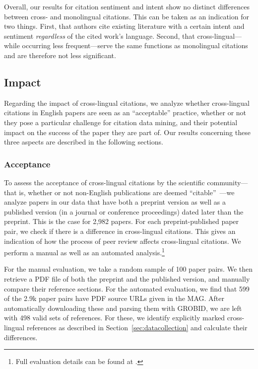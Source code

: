 Overall, our results for citation sentiment and intent show no distinct differences between cross- and monolingual citations. This can be taken as an indication for two things. First, that authors cite existing literature with a certain intent and sentiment \emph{regardless} of the cited work's language. Second, that cross-lingual---while occurring less frequent---serve the same functions as monolingual citations and are therefore not less significant.


\subsection{Impact}
\label{sec:xling-impact}
Regarding the impact of cross-lingual citations, we analyze whether cross-lingual citations in English papers are seen as an ``acceptable'' practice, whether or not they pose a particular challenge for citation data mining, and their potential impact on the success of the paper they are part of. Our results concerning these three aspects are described in the following sections.

\subsubsection{Acceptance}

To assess the acceptance of cross-lingual citations by the scientific community---that is, whether or not non-English publications are deemed ``citable''~\cite{Lillis2010}---we analyze papers in our data that have both a preprint version as well as a published version (in a journal or conference proceedings) dated later than the preprint. This is the case for 2,982 papers. For each preprint-published paper pair, we check if there is a difference in cross-lingual citations. This gives an indication of how the process of peer review affects cross-lingual citations.
We perform a manual as well as an automated analysis.\footnote{Full evaluation details can be found at .}

For the manual evaluation, we take a random sample of 100 paper pairs. We then retrieve a PDF file of both the preprint and the published version, and manually compare their reference sections. For the automated evaluation, we find that 599 of the 2.9k paper pairs have PDF source URLs given in the MAG. After automatically downloading these and parsing them with GROBID, we are left with 498 valid sets of references. For these, we identify explicitly marked cross-lingual references as described in Section~\ref{sec:datacollection} and calculate their differences.


